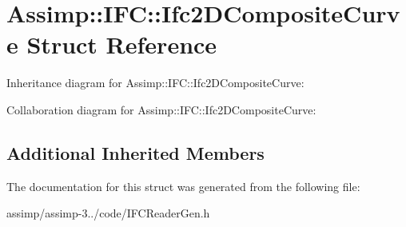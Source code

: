 \hypertarget{struct_assimp_1_1_i_f_c_1_1_ifc2_d_composite_curve}{\section{Assimp\+:\+:I\+F\+C\+:\+:Ifc2\+D\+Composite\+Curve Struct Reference}
\label{struct_assimp_1_1_i_f_c_1_1_ifc2_d_composite_curve}
}


Inheritance diagram for Assimp\+:\+:I\+F\+C\+:\+:Ifc2\+D\+Composite\+Curve\+:


Collaboration diagram for Assimp\+:\+:I\+F\+C\+:\+:Ifc2\+D\+Composite\+Curve\+:
\subsection*{Additional Inherited Members}


The documentation for this struct was generated from the following file\+:\begin{DoxyCompactItemize}
\item 
assimp/assimp-\/3../code/I\+F\+C\+Reader\+Gen.\+h\end{DoxyCompactItemize}
